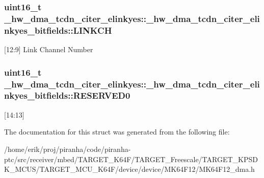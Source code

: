 \subsubsection[{\texorpdfstring{L\+I\+N\+K\+CH}{LINKCH}}]{\setlength{\rightskip}{0pt plus 5cm}uint16\+\_\+t \+\_\+hw\+\_\+dma\+\_\+tcdn\+\_\+citer\+\_\+elinkyes\+::\+\_\+hw\+\_\+dma\+\_\+tcdn\+\_\+citer\+\_\+elinkyes\+\_\+bitfields\+::\+L\+I\+N\+K\+CH}\hypertarget{struct__hw__dma__tcdn__citer__elinkyes_1_1__hw__dma__tcdn__citer__elinkyes__bitfields_a8949560030d9f7a47495a51b4828aa81}{}\label{struct__hw__dma__tcdn__citer__elinkyes_1_1__hw__dma__tcdn__citer__elinkyes__bitfields_a8949560030d9f7a47495a51b4828aa81}
\mbox{[}12\+:9\mbox{]} Link Channel Number 
\subsubsection[{\texorpdfstring{R\+E\+S\+E\+R\+V\+E\+D0}{RESERVED0}}]{\setlength{\rightskip}{0pt plus 5cm}uint16\+\_\+t \+\_\+hw\+\_\+dma\+\_\+tcdn\+\_\+citer\+\_\+elinkyes\+::\+\_\+hw\+\_\+dma\+\_\+tcdn\+\_\+citer\+\_\+elinkyes\+\_\+bitfields\+::\+R\+E\+S\+E\+R\+V\+E\+D0}\hypertarget{struct__hw__dma__tcdn__citer__elinkyes_1_1__hw__dma__tcdn__citer__elinkyes__bitfields_a1f323ac0d5ea5bc3415c38169a242d9a}{}\label{struct__hw__dma__tcdn__citer__elinkyes_1_1__hw__dma__tcdn__citer__elinkyes__bitfields_a1f323ac0d5ea5bc3415c38169a242d9a}
\mbox{[}14\+:13\mbox{]} 

The documentation for this struct was generated from the following file\+:\begin{DoxyCompactItemize}
\item 
/home/erik/proj/piranha/code/piranha-\/ptc/src/receiver/mbed/\+T\+A\+R\+G\+E\+T\+\_\+\+K64\+F/\+T\+A\+R\+G\+E\+T\+\_\+\+Freescale/\+T\+A\+R\+G\+E\+T\+\_\+\+K\+P\+S\+D\+K\+\_\+\+M\+C\+U\+S/\+T\+A\+R\+G\+E\+T\+\_\+\+M\+C\+U\+\_\+\+K64\+F/device/device/\+M\+K64\+F12/M\+K64\+F12\+\_\+dma.\+h\end{DoxyCompactItemize}
